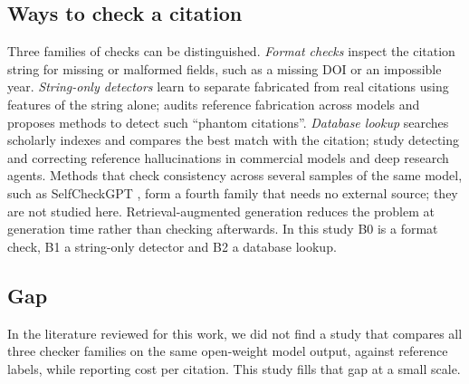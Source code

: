 \documentclass[10pt,twocolumn]{article}
\begin{document}
\subsection{Ways to check a citation}
Three families of checks can be distinguished. \emph{Format checks} inspect the citation string for missing or malformed fields, such as a missing DOI or an impossible year. \emph{String-only detectors} learn to separate fabricated from real citations using features of the string alone; \citet{naser2026} audits reference fabrication across models and proposes methods to detect such ``phantom citations''. \emph{Database lookup} searches scholarly indexes and compares the best match with the citation; \citet{rao2026} study detecting and correcting reference hallucinations in commercial models and deep research agents. Methods that check consistency across several samples of the same model, such as SelfCheckGPT \citep{manakul2023}, form a fourth family that needs no external source; they are not studied here. Retrieval-augmented generation \citep{lewis2020} reduces the problem at generation time rather than checking afterwards. In this study B0 is a format check, B1 a string-only detector and B2 a database lookup.

\subsection{Gap}
In the literature reviewed for this work, we did not find a study that compares all three checker families on the same open-weight model output, against reference labels, while reporting cost per citation. This study fills that gap at a small scale.

\end{document}
